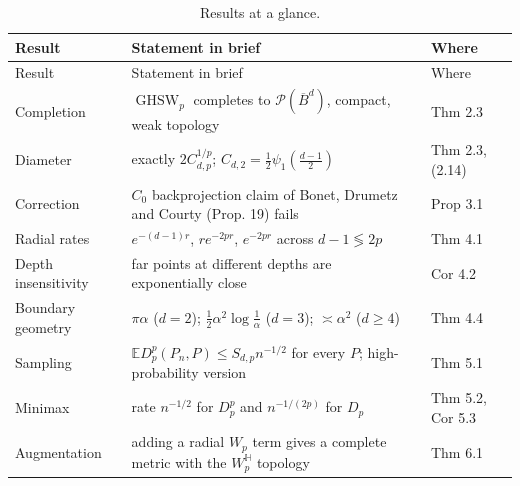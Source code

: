 \documentclass[
  british,
  11pt,
  a4paper,
]{article}
\begin{document}
\begin{longtable}[]{@{}
  >{\raggedright\arraybackslash}p{}
  >{\raggedright\arraybackslash}p{}
  >{\raggedright\arraybackslash}p{}@{}}
\caption{Results at a glance.}\tabularnewline
\toprule\noalign{}
\begin{minipage}[b]{\linewidth}\raggedright
Result
\end{minipage} & \begin{minipage}[b]{\linewidth}\raggedright
Statement in brief
\end{minipage} & \begin{minipage}[b]{\linewidth}\raggedright
Where
\end{minipage} \\
\midrule\noalign{}
\endfirsthead
\toprule\noalign{}
\begin{minipage}[b]{\linewidth}\raggedright
Result
\end{minipage} & \begin{minipage}[b]{\linewidth}\raggedright
Statement in brief
\end{minipage} & \begin{minipage}[b]{\linewidth}\raggedright
Where
\end{minipage} \\
\midrule\noalign{}
\endhead
\bottomrule\noalign{}
\endlastfoot
Completion & \(\operatorname{GHSW}_p\) completes to
\(\mathcal P(\overline B^d)\), compact, weak topology & Thm 2.3 \\
Diameter & exactly \(2C_{d,p}^{1/p}\);
\(C_{d,2}=\tfrac12\psi_1(\tfrac{d-1}2)\) & Thm 2.3, (2.14) \\
Correction & \(C_0\) backprojection claim of Bonet, Drumetz and Courty
(Prop. 19) fails & Prop 3.1 \\
Radial rates & \(e^{-(d-1)r}\), \(re^{-2pr}\), \(e^{-2pr}\) across
\(d-1\lessgtr2p\) & Thm 4.1 \\
Depth insensitivity & far points at different depths are exponentially
close & Cor 4.2 \\
Boundary geometry & \(\pi\alpha\) (\(d=2\));
\(\tfrac12\alpha^2\log\tfrac1\alpha\) (\(d=3\)); \(\asymp\alpha^2\)
(\(d\ge4\)) & Thm 4.4 \\
Sampling & \(\mathbb ED_p^p(P_n,P)\le S_{d,p}n^{-1/2}\) for every \(P\);
high-probability version & Thm 5.1 \\
Minimax & rate \(n^{-1/2}\) for \(D_p^p\) and \(n^{-1/(2p)}\) for
\(D_p\) & Thm 5.2, Cor 5.3 \\
Augmentation & adding a radial \(W_p\) term gives a complete metric with
the \(W_p^{\mathbb H}\) topology & Thm 6.1 \\
\end{longtable}
\end{document}
